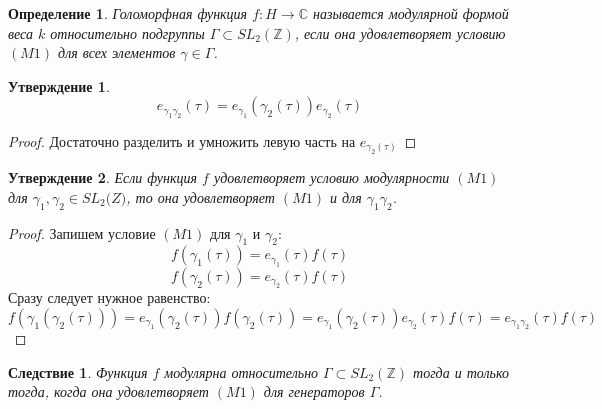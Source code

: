 \documentclass{article}
\newcommand{\ZZ}{\mathbb{Z}}
\newcommand{\CC}{\mathbb{C}}
\theoremstyle{break}
\newtheorem{definition}[theorem]{Определение}
\newtheorem{claim}{Утверждение}[section]
\newtheorem{corollary}{Следствие}[section] %
\begin{document}
\begin{definition}
	Голоморфная функция $f: H \to \CC$ называется модулярной формой веса $k$ относительно подгруппы $\Gamma \subset SL_2(\ZZ)$, если она удовлетворяет условию $(M1)$ для всех элементов $\gamma \in \Gamma$.
\end{definition}


\begin{claim}
	\begin{equation}
	e_{\gamma_1 \gamma_2}(\tau) = e_{\gamma_1}(\gamma_2(\tau)) e_{\gamma_2}(\tau)
	\end{equation}
\end{claim}
\begin{proof}
	Достаточно разделить и умножить левую часть на $e_{\gamma_2(\tau)}$
\end{proof}

\begin{claim}
	Если функция $f$ удовлетворяет условию модулярности $(M1)$ для $\gamma_1, \gamma_2 \in SL_2\big(Z)$, то она удовлетворяет $(M1)$ и для $\gamma_1 \gamma_2$.
\end{claim}

\begin{proof}
	Запишем условие $(M1)$ для $\gamma_1$ и $\gamma_2$:
	\begin{equation}
	f(\gamma_1(\tau)) = e_{\gamma_1}(\tau) f(\tau)
	\end{equation}
	\begin{equation}
	f(\gamma_2(\tau)) = e_{\gamma_2}(\tau) f(\tau)
	\end{equation}
	Сразу следует нужное равенство: 
	\begin{equation}
	f(\gamma_1(\gamma_2(\tau))) = e_{\gamma_1}(\gamma_2(\tau)) f(\gamma_2(\tau))
	= e_{\gamma_1}(\gamma_2(\tau)) e_{\gamma_2}(\tau) f(\tau) 
	= e_{\gamma_1 \gamma_2}(\tau) f(\tau)
	\end{equation}
\end{proof}


\begin{corollary}
	Функция $f$ модулярна относительно $\Gamma \subset SL_2(\ZZ)$ тогда и только тогда, когда она удовлетворяет $(M1)$ для генераторов $\Gamma$.
\end{corollary}
\end{document}
